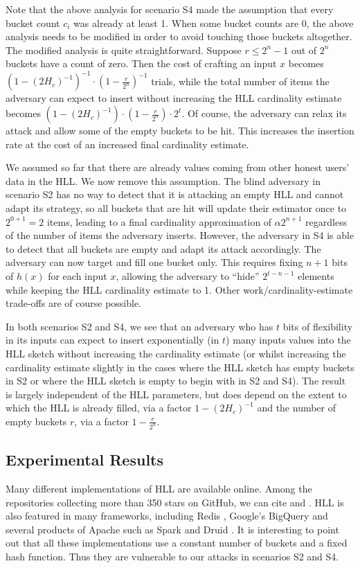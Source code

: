 \documentclass{IEEEtran}
\begin{document}
Note that the above analysis for scenario S4 made the assumption that every bucket count $c_i$ was already at least 1. When some bucket counts are 0, the above analysis needs to be modified in order to avoid touching those buckets altogether. The modified analysis is quite straightforward. Suppose $r \le 2^n-1$ out of $2^n$ buckets have a count of zero. Then the cost of crafting an input $x$ becomes $(1-(2H_c)^{-1})^{-1} \cdot (1- \frac{r}{2^n})^{-1}$ trials, while the total number of items the adversary can expect to insert without increasing the HLL cardinality estimate becomes $(1-(2H_c)^{-1}) \cdot (1- \frac{r}{2^n})\cdot 2^t$. Of course, the adversary can relax its attack and allow some of the empty buckets to be hit. This increases the insertion rate at the cost of an increased final cardinality estimate.

We assumed so far that there are already values coming from other honest users' data in the HLL. We now remove this assumption. The blind adversary in scenario S2 has no way to detect that it is attacking an empty HLL and cannot adapt its strategy, so all buckets that are hit will update their estimator once to $2^{0+1}=2$ items, leading to a final cardinality approximation of $\alpha2^{n+1}$ regardless of the number of items the adversary inserts. However, the adversary in S4 is able to detect that all buckets are empty and adapt its attack accordingly. The adversary can now target and fill one bucket only. This requires fixing $n+1$ bits of $h(x)$ for each input $x$, allowing the adversary to ``hide'' $2^{t-n-1}$ elements while keeping the HLL cardinality estimate to 1. Other work/cardinality-estimate trade-offs are of course possible.

In both scenarios S2 and S4, we see that an adversary who has $t$ bits of flexibility in its inputs can expect to insert exponentially (in $t$) many inputs values into the HLL sketch without increasing the cardinality estimate (or whilst increasing the cardinality estimate slightly in the cases where the HLL sketch has empty buckets in S2 or where the HLL sketch is empty to begin with in S2 and S4). The result is largely independent of the HLL parameters, but does depend on the extent to which the HLL is already filled, via a factor $1-(2H_c)^{-1}$ and the number of empty buckets $r$, via a factor $1- \frac{r}{2^n}$.


\subsection{Experimental Results}
Many different implementations of HLL are available online. Among the repositories collecting more than 350 stars on GitHub, we can cite \cite{clahll} and \cite{datasketch}. HLL is also featured in many frameworks, including Redis \cite{redis}, Google's BigQuery \cite{bigquery} and several products of Apache such as Spark \cite{spahll,spahll2} and Druid \cite{druhll}. It is interesting to point out that all these implementations use a constant number of buckets and a fixed hash function. Thus they are vulnerable to our attacks in scenarios S2 and S4.
\end{document}
